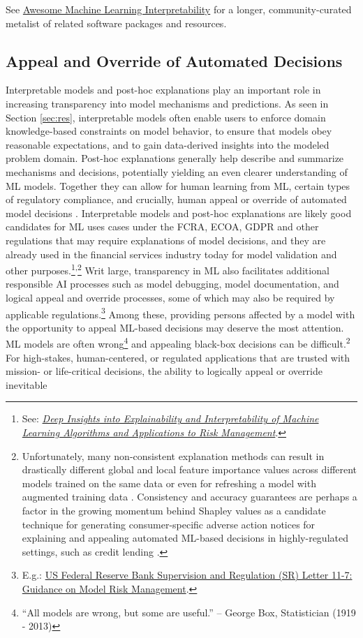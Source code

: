 \documentclass[information,article,submit,moreauthors,pdftex]{definitions/mdpi}
\begin{document}
\noindent See \href{https://github.com/jphall663/awesome-machine-learning-interpretability}{Awesome Machine Learning Interpretability} for a longer, community-curated metalist of related software packages and resources. 

\subsection{Appeal and Override of Automated Decisions}

Interpretable models and post-hoc explanations play an important role in increasing transparency into model mechanisms and predictions. As seen in Section \ref{sec:res}, interpretable models often enable users to enforce domain knowledge-based constraints on model behavior, to ensure that models obey reasonable expectations, and to gain data-derived insights into the modeled problem domain. Post-hoc explanations generally help describe and summarize mechanisms and decisions, potentially yielding an even clearer understanding of ML models. Together they can allow for human learning from ML, certain types of regulatory compliance, and crucially, human appeal or override of automated model decisions \cite{art_and_sci}. Interpretable models and post-hoc explanations are likely good candidates for ML uses cases under the FCRA, ECOA, GDPR and other regulations that may require explanations of model decisions, and they are already used in the financial services industry today for model validation and other purposes.\footnote{See: \href{https://ww2.amstat.org/meetings/jsm/2019/onlineprogram/AbstractDetails.cfm?abstractid=303053}{\textit{Deep Insights into Explainability and Interpretability of Machine Learning Algorithms and Applications to Risk Management}}.}\textsuperscript{,}\footnote{Unfortunately, many non-consistent explanation methods can result in drastically different global and local feature importance values across different models trained on the same data or even for refreshing a model with augmented training data \cite{molnar}. Consistency and accuracy guarantees are perhaps a factor in the growing momentum behind Shapley values as a candidate technique for generating consumer-specific adverse action notices for explaining and appealing automated ML-based decisions in highly-regulated settings, such as credit lending \cite{bracke2019machine}.} Writ large, transparency in ML also facilitates additional responsible AI processes such as model debugging, model documentation, and logical appeal and override processes, some of which may also be required by applicable regulations.\footnote{E.g.: \href{https://www.federalreserve.gov/supervisionreg/srletters/sr1107.htm}{US Federal Reserve Bank Supervision and Regulation (SR) Letter 11-7: Guidance on Model Risk Management}.} Among these, providing persons affected by a model with the opportunity to appeal ML-based decisions may deserve the most attention. ML models are often wrong\footnote{``All models are wrong, but some are useful.'' -- George Box, Statistician (1919 - 2013)} and appealing black-box decisions can be difficult.\textsuperscript{2} For high-stakes, human-centered, or regulated applications that are trusted with mission- or life-critical decisions, the ability to logically appeal or override inevitable 
\end{document}
